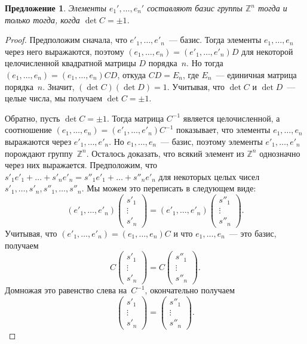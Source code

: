 \documentclass[a4paper,10pt]{amsart}
\def\ZZ{{\mathbb Z}}%
\newtheorem{proposition}{Предложение}
\theoremstyle{definition}
\theoremstyle{remark}
\begin{document}
\begin{proposition}
Элементы $e_1', \ldots, e_n'$ составляют базис группы $\ZZ^n$ тогда
и только тогда, когда $\det C = \pm 1$.
\end{proposition}

\begin{proof}
Предположим сначала, что $e'_1, \ldots, e'_n$~--- базис. Тогда
элементы $e_1, \ldots, e_n$ через него выражаются, поэтому $(e_1,
\ldots, e_n) = (e'_1, \ldots, e'_n) D$ для некоторой целочисленной
квадратной матрицы $D$ порядка~$n$. Но тогда $(e_1, \ldots, e_n) =
(e_1, \ldots, e_n)CD$, откуда $CD = E_n$, где $E_n$~--- единичная
матрица порядка~$n$. Значит, $(\det C)(\det D) = 1$. Учитывая, что
$\det C$ и $\det D$~--- целые числа, мы получаем $\det C = \pm 1$.

Обратно, пусть $\det C = \pm 1$. Тогда матрица $C^{-1}$ является
целочисленной, а соотношение $(e_1, \ldots, e_n) = (e'_1, \ldots,
e'_n)C^{-1}$ показывает, что элементы $e_1, \ldots, e_n$ выражаются
через $e'_1, \ldots, e'_n$. Но $e_1, \ldots, e_n$~--- базис, поэтому
элементы $e'_1, \ldots, e'_n$ порождают группу~$\ZZ^n$. Осталось
доказать, что всякий элемент из $\ZZ^n$ однозначно через них
выражается. Предположим, что $s'_1e'_1 + \ldots + s'_ne'_n =
s''_1e'_1 + \ldots + s''_n e'_n$ для некоторых целых чисел $s'_1,
\ldots, s'_n, s''_1, \ldots, s''_n$. Мы можем это переписать в
следующем виде:
$$
(e'_1, \ldots, e'_n)
\begin{pmatrix} s'_1 \\ \vdots \\ s'_n \end{pmatrix} =
(e'_1, \ldots, e'_n)
\begin{pmatrix} s''_1 \\ \vdots \\ s''_n \end{pmatrix}.
$$
Учитывая, что $(e'_1, \ldots, e'_n) = (e_1, \ldots, e_n)C$ и что
$e_1, \ldots, e_n$~--- это базис, получаем
$$
C \begin{pmatrix} s'_1 \\ \vdots \\ s'_n \end{pmatrix} = C
\begin{pmatrix} s''_1 \\ \vdots \\ s''_n \end{pmatrix}.
$$
Домножая это равенство слева на~$C^{-1}$, окончательно получаем
$$
\begin{pmatrix} s'_1 \\ \vdots \\ s'_n \end{pmatrix} =
\begin{pmatrix} s''_1 \\ \vdots \\ s''_n \end{pmatrix}.
$$
\end{proof}
\end{document}
